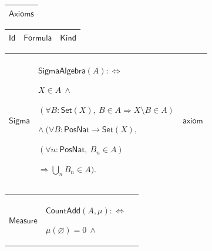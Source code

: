 \documentclass[11pt]{amsart}
\renewcommand{\arraystretch}{1.4}
\newlength{\FTCOneColumnBody}
\newlength{\FTCThreeColumnBody}
\begin{document}
{\centering
\renewcommand{\arraystretch}{1.4}
\par\setlength{\parskip}{0pt}\nointerlineskip
\noindent
\begin{tabular}{|@{}>{\centering\arraybackslash}m{\FTCOneColumnBody}|}\hline
$\displaystyle \textsf{Axioms}$\\ \hline
\end{tabular}%
\par\setlength{\parskip}{0pt}\nointerlineskip
\noindent
\begin{tabular}{|@{}>{\centering\arraybackslash}m{0.251968\FTCThreeColumnBody}|>{\centering\arraybackslash}m{0.590551\FTCThreeColumnBody}|>{\centering\arraybackslash}m{0.157480\FTCThreeColumnBody}|}\hline
$\displaystyle \textsf{Id}$ & $\displaystyle \textsf{Formula}$ & $\displaystyle \textsf{Kind}$\\ \hline
\end{tabular}%
\par\setlength{\parskip}{0pt}\nointerlineskip
\noindent
\begin{tabular}{|@{}>{\centering\arraybackslash}m{0.251968\FTCThreeColumnBody}|>{\centering\arraybackslash}m{0.590551\FTCThreeColumnBody}|>{\centering\arraybackslash}m{0.157480\FTCThreeColumnBody}|}\hline
\hypertarget{ax:Sigma}{$\displaystyle \textsf{Sigma}$} & $\displaystyle \textsf{SigmaAlgebra}(A):\Longleftrightarrow$\par
$\displaystyle X\in A\ \land$\par
$\displaystyle (\forall B:\textsf{Set}(X),\ B\in A\Rightarrow X\setminus B\in A)$\par
$\displaystyle \land\ (\forall B:\textsf{PosNat}\to\textsf{Set}(X),$\par
$\displaystyle (\forall n:\textsf{PosNat},\ B_n\in A)$\par
$\displaystyle \Rightarrow\bigcup_n B_n\in A).$ & $\displaystyle \textsf{axiom}$\\ \hline
\end{tabular}%
\par\setlength{\parskip}{0pt}\nointerlineskip
\noindent
\begin{tabular}{|@{}>{\centering\arraybackslash}m{0.251968\FTCThreeColumnBody}|>{\centering\arraybackslash}m{0.590551\FTCThreeColumnBody}|>{\centering\arraybackslash}m{0.157480\FTCThreeColumnBody}|}\hline
\hypertarget{ax:Measure}{$\displaystyle \textsf{Measure}$} & $\displaystyle \textsf{CountAdd}(A,\mu):\Longleftrightarrow$\par
$\displaystyle \mu(\varnothing)=0\ \land$\par

\end{tabular}}
\end{document}
